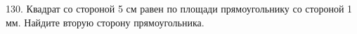 130. Квадрат со стороной 5 см равен по площади прямоугольнику со стороной 1 мм. Найдите вторую сторону прямоугольника.\\
